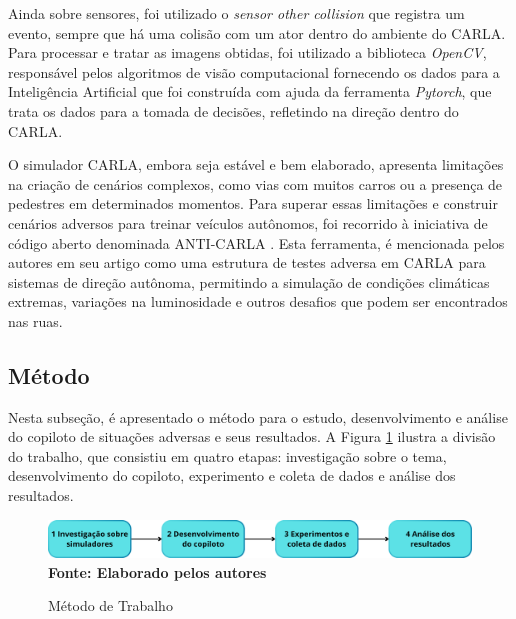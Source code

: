 \documentclass[a4paper,12pt,Times]{article}
\begin{document}
Ainda sobre sensores, foi utilizado o \textit{sensor other collision} que registra um evento, sempre que há uma colisão com um ator dentro do ambiente do CARLA. Para processar e tratar as imagens obtidas, foi utilizado a biblioteca \textit{OpenCV}, responsável pelos algoritmos de visão computacional fornecendo os dados para a Inteligência Artificial que foi construída com ajuda da ferramenta \textit{Pytorch}, que trata os dados para a tomada de decisões, refletindo na direção dentro do CARLA.



O simulador CARLA, embora seja estável e bem elaborado, apresenta limitações na criação de cenários complexos, como vias com muitos carros ou a presença de pedestres em determinados momentos. Para superar essas limitações e construir cenários adversos para treinar veículos autônomos, foi recorrido à iniciativa de código aberto denominada ANTI-CARLA \cite{ramakrishna2022anticarla}. Esta ferramenta, é mencionada pelos autores em seu artigo como uma estrutura de testes adversa em CARLA para sistemas de direção autônoma, permitindo a simulação de condições climáticas extremas, variações na luminosidade e outros desafios que podem ser encontrados nas ruas.

\subsection{Método}

Nesta subseção, é apresentado o método para o estudo, desenvolvimento e análise do copiloto de situações adversas e seus resultados. A Figura \ref{fig:metodologia_tcc} ilustra a divisão do trabalho, que consistiu em quatro etapas: investigação sobre o tema, desenvolvimento do copiloto, experimento e coleta de dados e análise dos resultados.

\begin{figure}[H]
    \centering
    \caption{Método de Trabalho}
    \includegraphics[scale=0.55]{figuras/Metodologia TCC.png}\captionsetup{justification=centering}
  \vspace{-0.2cm}
     \\\textbf{\footnotesize Fonte: Elaborado pelos autores}
    \label{fig:metodologia_tcc}
\end{figure}
\end{document}
